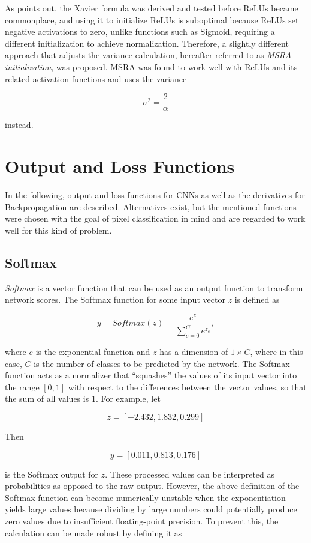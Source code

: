\noindent As \cite{rectifiers} points out, the Xavier formula was derived and tested before ReLUs became commonplace, and using it to initialize ReLUs is suboptimal because ReLUs set negative activations to zero, unlike functions such as Sigmoid, requiring a different initialization to achieve normalization. Therefore, a slightly different approach that adjusts the variance calculation, hereafter referred to as \textit{MSRA initialization}, was proposed. MSRA was found to work well with ReLUs and its related activation functions and uses the variance

\[ \sigma^2 = \frac{2}{\alpha} \]

\noindent instead.


	\section {Output and Loss Functions}
In the following, output and loss functions for CNNs as well as the derivatives for Backpropagation are described. Alternatives exist, but the mentioned functions were chosen with the goal of pixel classification in mind and are regarded to work well for this kind of problem.


	\subsection{Softmax}
\label{subsec:softmax}

\textit{Softmax} is a vector function that can be used as an output function to transform network scores. The Softmax function for some input vector $z$ is defined as

\[y = Softmax(z) = \frac{e^{z}}{\sum_{c=0}^{C} e^{z_c}},\]

\noindent where $e$ is the exponential function and $z$ has a dimension of $1 \times C$, where in this case, $C$ is the number of classes to be predicted by the network. The Softmax function acts as a normalizer that ``squashes'' the values of its input vector into the range $[0, 1]$ with respect to the differences between the vector values, so that the sum of all values is $1$. For example, let 

\[ z = [-2.432, 1.832, 0.299] \]

\noindent Then 

\[ y = [0.011, 0.813, 0.176] \]

\noindent is the Softmax output for $z$. These processed values can be interpreted as probabilities as opposed to the raw output. However, the above definition of the Softmax function can become numerically unstable when the exponentiation yields large values because dividing by large numbers could potentially produce zero values due to insufficient floating-point precision. To prevent this, the calculation can be made robust by defining it as

